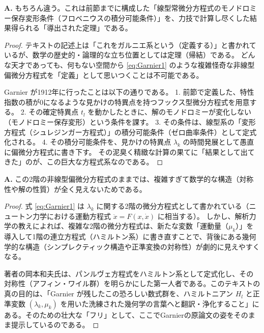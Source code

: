 \begin{Q}
\textbf{A.} もちろん違う。これは前節までに構成した「線型常微分方程式のモノドロミー保存変形条件（フロベニウスの積分可能条件）」を、力技で計算し尽くした結果得られる「導出された定理」である。

\begin{proof}
テキストの記述上は「これをガルニエ系という（定義する）」と書かれているが、数学の歴史的・論理的な立ち位置としては定理（帰結）である。
どんな天才であっても、何もない空間から \eqref{eq:Garnier1} のような複雑怪奇な非線型偏微分方程式を「定義」として思いつくことは不可能である。

Garnier が1912年に行ったことは以下の通りである。
1. 前節で定義した、特性指数の積が0になるような見かけの特異点を持つフックス型微分方程式を用意する。
2. その確定特異点 $t_l$ を動かしたときに、解のモノドロミーが変化しない（モノドロミー保存変形）という条件を課す。
3. その条件は、線型系の「変形方程式（シュレジンガー方程式）」の積分可能条件（ゼロ曲率条件）として定式化される。
4. その積分可能条件を、見かけの特異点 $\lambda_k$ の時間発展として愚直に偏微分方程式に書き下す。
その泥臭く精緻な計算の果てに「結果として出てきた」のが、この巨大な方程式系なのである。
\end{proof}
\end{Q}

\begin{Q}
\textbf{A.} この2階の非線型偏微分方程式のままでは、複雑すぎて数学的な構造（対称性や解の性質）が全く見えないためである。

\begin{proof}
式 \eqref{eq:Garnier1} は $\lambda_k$ に関する2階の微分方程式として書かれている（ニュートン力学における運動方程式 $\ddot{x} = F(x, \dot{x})$ に相当する）。
しかし、解析力学の教えによれば、複雑な2階の微分方程式は、新たな変数「運動量（$\mu_k$）」を導入して1階の連立方程式（ハミルトン系）に書き直すことで、背後にある幾何学的な構造（シンプレクティック構造や正準変換の対称性）が劇的に見えやすくなる。

著者の岡本和夫氏は、パンルヴェ方程式をハミルトン系として定式化し、その対称性（アフィン・ワイル群）を明らかにした第一人者である。このテキストの真の目的は、「Garnier が残したこの恐ろしい数式群を、ハミルトニアン $H_l$ と正準変数 $(\lambda_k, \mu_k)$ を用いた洗練された幾何学の言葉へと翻訳・浄化すること」にある。そのための壮大な「フリ」として、ここでGarnierの原論文の姿をそのまま提示しているのである。
\end{proof}
\end{Q}

